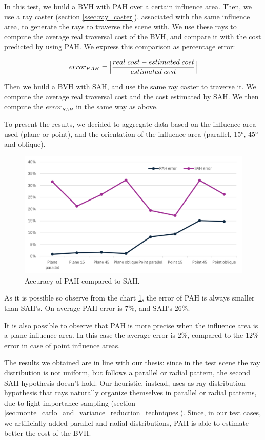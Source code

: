\documentclass{PoliMi_MasterThesis}
\begin{document}
In this test, we build a BVH with PAH over a certain influence area. Then, we use a ray caster (section \ref{ssec:ray_caster}), associated with the same influence area, to generate the rays to traverse the scene with. We use these rays to compute the average real traversal cost of the BVH, and compare it with the cost predicted by using PAH. We express this comparison as percentage error:

$$error_{PAH} = \Big{|}\frac{real \; cost - estimated \; cost}{estimated \; cost}\Big{|}$$

Then we build a BVH with SAH, and use the same ray caster to traverse it. We compute the average real traversal cost and the cost estimated by SAH. We then compute the $error_{SAH}$ in the same way as above.

To present the results, we decided to aggregate data based on the influence area used (plane or point), and the orientation of the influence area (parallel, 15°, 45° and oblique).

\begin{figure}[H]
	\centering
	\includegraphics[width=\textwidth]{Images/pah_accuracy_chart.png}
	\caption{Accuracy of PAH compared to SAH.} 
	\label{fig:pah_accuracy_chart}
\end{figure}

As it is possible so observe from the chart \ref{fig:pah_accuracy_chart}, the error of PAH is always smaller than SAH's. On average PAH error is $7\%$, and SAH's $26\%$.

It is also possible to observe that PAH is more precise when the influence area is a plane influence area. In this case the average error is $2\%$, compared to the $12\%$ error in case of point influence areas.

The results we obtained are in line with our thesis: since in the test scene the ray distribution is not uniform, but follows a parallel or radial pattern, the second SAH hypothesis doesn't hold. Our heuristic, instead, uses as ray distribution hypothesis that rays naturally organize themselves in parallel or radial patterns, due to light importance sampling (section \ref{sec:monte_carlo_and_variance_reduction_techniques}). Since, in our test cases, we artificially added parallel and radial distributions, PAH is able to estimate better the cost of the BVH.
\end{document}
